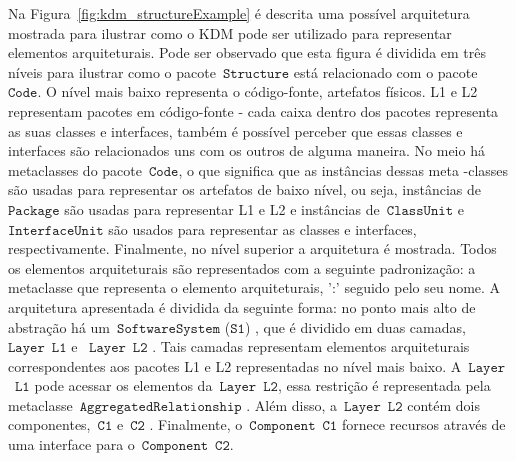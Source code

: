Na Figura~\ref{fig:kdm_structureExample} é descrita uma possível arquitetura mostrada para ilustrar como o KDM pode ser utilizado para representar elementos arquiteturais. Pode ser observado que esta figura é dividida em três níveis para ilustrar como o pacote~$\mathtt{Structure}$ está relacionado com o pacote~$\mathtt{Code}$. O nível mais baixo representa o código-fonte, artefatos físicos. L1 e L2 representam pacotes em código-fonte - cada caixa dentro dos pacotes representa as suas classes e interfaces, também é possível perceber que essas classes e interfaces são relacionados uns com os outros de alguma maneira. No meio há metaclasses do pacote~$\mathtt{Code}$, o que significa que as instâncias dessas meta -classes são usadas para representar os artefatos de baixo nível, ou seja, instâncias de~$\mathtt{Package}$ são usadas para representar L1 e L2 e instâncias de~$\mathtt{ClassUnit}$ e~$\mathtt{InterfaceUnit}$ são usados para representar as classes e interfaces, respectivamente. Finalmente, no nível superior a arquitetura é mostrada. Todos os elementos arquiteturais são representados com a seguinte padronização: a metaclasse que representa o elemento arquiteturais, ':' seguido pelo seu nome. A arquitetura apresentada é dividida da seguinte forma: no ponto mais alto de abstração há um~$\mathtt{SoftwareSystem}$ ($\mathtt{S1}$) , que é dividido em duas camadas, ~$\mathtt{Layer}$~$\mathtt{L1}$  e ~$\mathtt{Layer}$~$\mathtt{L2}$ . Tais camadas representam elementos arquiteturais correspondentes aos pacotes L1 e L2 representadas no nível mais baixo. A~$\mathtt{Layer}$~$\mathtt{L1}$ pode acessar os elementos da~$\mathtt{Layer}$~$\mathtt{L2}$, essa restrição  é representada pela metaclasse~$\mathtt{AggregatedRelationship}$ . Além disso, a~$\mathtt{Layer}$~$\mathtt{L2}$ contém dois componentes,~$\mathtt{C1}$  e~$\mathtt{C2}$ . Finalmente, o~$\mathtt{Component}$~$\mathtt{C1}$ fornece recursos através de uma interface para o~$\mathtt{Component}$~$\mathtt{C2}$.

